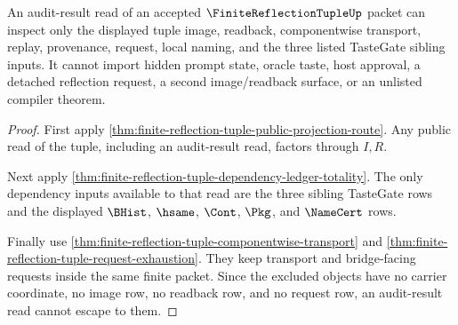 \begin{theorem}
\label{thm:finite-reflection-tuple-audit-result-nonescape}
An audit-result read of an accepted $\FiniteReflectionTupleUp$ packet can inspect only the displayed tuple image, readback, componentwise transport, replay, provenance, request, local naming, and the three listed TasteGate sibling inputs. It cannot import hidden prompt state, oracle taste, host approval, a detached reflection request, a second image/readback surface, or an unlisted compiler theorem.
\end{theorem}
\begin{proof}
First apply \autoref{thm:finite-reflection-tuple-public-projection-route}. Any public read of the tuple, including an audit-result read, factors through $I,R$.

Next apply \autoref{thm:finite-reflection-tuple-dependency-ledger-totality}. The only dependency inputs available to that read are the three sibling TasteGate rows and the displayed $\BHist$, $\hsame$, $\Cont$, $\Pkg$, and $\NameCert$ rows.

Finally use \autoref{thm:finite-reflection-tuple-componentwise-transport} and \autoref{thm:finite-reflection-tuple-request-exhaustion}. They keep transport and bridge-facing requests inside the same finite packet. Since the excluded objects have no carrier coordinate, no image row, no readback row, and no request row, an audit-result read cannot escape to them.
\end{proof}

